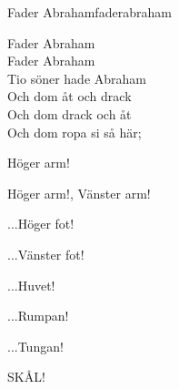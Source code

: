 \begin{song}{Fader Abraham}{faderabraham}
\begin{vers}
Fader Abraham\\
Fader Abraham\\
Tio söner hade Abraham\\
Och dom åt och drack\\
Och dom drack och åt\\
Och dom ropa si så här;\\
\end{vers}
\begin{vers}
Höger arm!
\end{vers}
\begin{vers}
Höger arm!, Vänster arm!
\end{vers}
\begin{vers}
...Höger fot!
\end{vers}
\begin{vers}
...Vänster fot!
\end{vers}
\begin{vers}
...Huvet!
\end{vers}
\begin{vers}
...Rumpan!
\end{vers}
\begin{vers}
...Tungan!
\end{vers}
\begin{vers}
SKÅL!
\end{vers}
\end{song}
